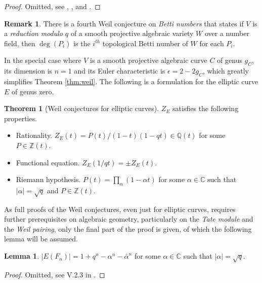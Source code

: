 \documentclass{article}
\newcommand{\Z}{\mathbb{Z}}
\newcommand{\Q}{\mathbb{Q}}
\newcommand{\C}{\mathbb{C}}
\newcommand{\rb}[1]{\left( #1 \right)}
\newcommand{\abs}[1]{\left\lvert #1 \right\rvert}
\theoremstyle{definition}\newtheorem*{definition}{Definition}
\theoremstyle{definition}\newtheorem*{example}{Example}
\theoremstyle{definition}\newtheorem*{remark}{Remark}
\newtheorem{lemma}[proposition]{Lemma}
\newtheorem{theorem}[proposition]{Theorem}
\begin{document}
\begin{proof}
Omitted, see \cite{weil1}, \cite{weil2}, and \cite{weil3}.
\end{proof}

\pagebreak

\begin{remark}
There is a fourth Weil conjecture on \emph{Betti numbers} that states if $ V $ is a \emph{reduction modulo $ q $} of a smooth projective algebraic variety $ W $ over a number field, then $ \deg\rb{P_i} $ is the $ i^{th} $ topological Betti number of $ W $ for each $ P_i $.
\end{remark}

In the special case where $ V $ is a smooth projective algebraic curve $ C $ of genus $ g_C $, its dimension is $ n = 1 $ and its Euler characteristic is $ \epsilon = 2 - 2g_C $, which greatly simplifies Theorem \ref{thm:weil}. The following is a formulation for the elliptic curve $ E $ of genus zero.

\begin{theorem}[Weil conjectures for elliptic curves]
\label{thm:weilcurve}
$ Z_E $ satisfies the following properties.
\begin{itemize}
\item Rationality. $ Z_E\rb{t} = P\rb{t} / \rb{1 - t}\rb{1 - qt} \in \Q\rb{t} $ for some $ P \in \Z\rb{t} $.
\item Functional equation. $ Z_E\rb{1 / qt} = \pm Z_E\rb{t} $.
\item Riemann hypothesis. $ P\rb{t} = \prod_\alpha \rb{1 - \alpha t} $ for some $ \alpha \in \C $ such that $ \abs{\alpha} = \sqrt{q} $ and $ P \in \Z\rb{t} $.
\end{itemize}
\end{theorem}

As full proofs of the Weil conjectures, even just for elliptic curves, requires further prerequisites on algebraic geometry, particularly on the \emph{Tate module} and the \emph{Weil pairing}, only the final part of the proof is given, of which the following lemma will be assumed.

\begin{lemma}
$ \abs{E\rb{F_n}} = 1 + q^n - \alpha^n - \bar{\alpha}^n $ for some $ \alpha \in \C $ such that $ \abs{\alpha} = \sqrt{q} $.
\end{lemma}

\begin{proof}
Omitted, see V.2.3 in \cite{gtm}.
\end{proof}
\end{document}
